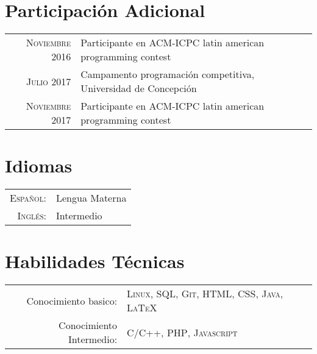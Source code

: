 \documentclass[a4paper,10pt]{article} %
\begin{document}
\section{Participaci\'on Adicional}

\begin{tabular}{rl}
\textsc{Noviembre} 2016 & Participante en ACM-ICPC latin american programming contest\\

\textsc{Julio} 2017 & Campamento programaci\'on competitiva, Universidad de Concepci\'on\\

\textsc{Noviembre} 2017 & Participante en ACM-ICPC latin american programming contest\\

\end{tabular}


\section{Idiomas}

\begin{tabular}{rl}
    \textsc{Espa\~nol:} & Lengua Materna\\

    \textsc{Ingl\'es:} & Intermedio\\
\end{tabular}


\section{Habilidades T\'ecnicas}

\begin{tabular}{rl}
    Conocimiento basico: & \textsc{Linux}, \textsc{SQL}, \textsc{Git}, \textsc{HTML}, \textsc{CSS}, \textsc{Java}, \textsc{LaTeX}\\

    Conocimiento Intermedio: & \textsc{C/C++}, \textsc{PHP}, \textsc{Javascript}\\
\end{tabular}
\end{document}
